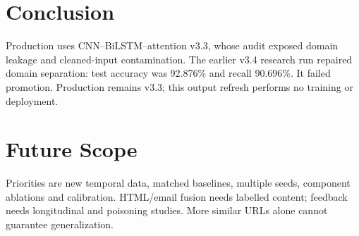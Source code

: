 \section{Conclusion}
Production uses CNN--BiLSTM--attention v3.3, whose audit exposed domain leakage and cleaned-input contamination. The earlier v3.4 research run repaired domain separation: test accuracy was 92.876\% and recall 90.696\%. It failed promotion. Production remains v3.3; this output refresh performs no training or deployment.

\section{Future Scope}
Priorities are new temporal data, matched baselines, multiple seeds, component ablations and calibration. HTML/email fusion needs labelled content; feedback needs longitudinal and poisoning studies. More similar URLs alone cannot guarantee generalization.
